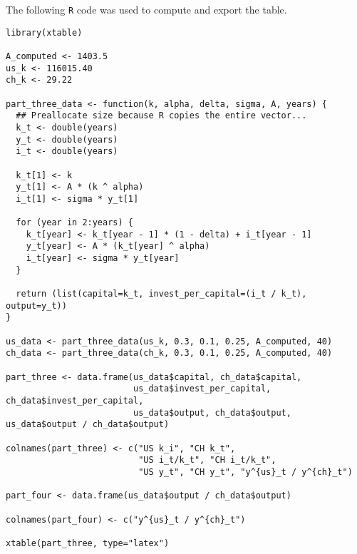 \documentclass[12pt,letterpaper]{article}
\theoremstyle{definition}
\begin{document}
The following \verb!R! code was used to compute and export the table. 

\begin{verbatim}
library(xtable)

A_computed <- 1403.5
us_k <- 116015.40
ch_k <- 29.22

part_three_data <- function(k, alpha, delta, sigma, A, years) {
  ## Preallocate size because R copies the entire vector...
  k_t <- double(years)
  y_t <- double(years)
  i_t <- double(years)

  k_t[1] <- k
  y_t[1] <- A * (k ^ alpha)
  i_t[1] <- sigma * y_t[1]

  for (year in 2:years) {
    k_t[year] <- k_t[year - 1] * (1 - delta) + i_t[year - 1]
    y_t[year] <- A * (k_t[year] ^ alpha)
    i_t[year] <- sigma * y_t[year]
  }

  return (list(capital=k_t, invest_per_capital=(i_t / k_t), output=y_t))
}

us_data <- part_three_data(us_k, 0.3, 0.1, 0.25, A_computed, 40)
ch_data <- part_three_data(ch_k, 0.3, 0.1, 0.25, A_computed, 40)

part_three <- data.frame(us_data$capital, ch_data$capital,
                         us_data$invest_per_capital, ch_data$invest_per_capital,
                         us_data$output, ch_data$output, us_data$output / ch_data$output)

colnames(part_three) <- c("US k_i", "CH k_t",
                          "US i_t/k_t", "CH i_t/k_t",
                          "US y_t", "CH y_t", "y^{us}_t / y^{ch}_t")

part_four <- data.frame(us_data$output / ch_data$output)

colnames(part_four) <- c("y^{us}_t / y^{ch}_t")

xtable(part_three, type="latex")
\end{verbatim}
\end{document}
